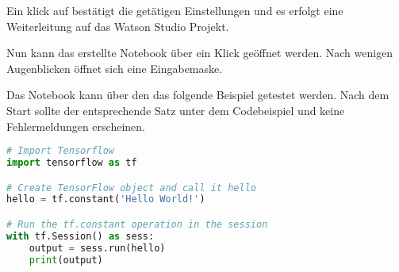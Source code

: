 Ein klick auf  bestätigt die getätigen Einstellungen und es erfolgt eine Weiterleitung auf das Watson
Studio Projekt.

Nun kann das erstellte Notebook über ein Klick geöffnet werden. Nach wenigen Augenblicken öffnet sich eine Eingabemaske.

Das Notebook kann über den das folgende Beispiel getestet werden. Nach dem Start sollte der entsprechende Satz unter dem
Codebeispiel und keine Fehlermeldungen erscheinen.

\begin{lstlisting}[language=Python, caption=Hello World für Notebook, label=Hello World für Notebook]
# Import Tensorflow
import tensorflow as tf

# Create TensorFlow object and call it hello
hello = tf.constant('Hello World!')

# Run the tf.constant operation in the session
with tf.Session() as sess:
    output = sess.run(hello)
    print(output)
\end{lstlisting}